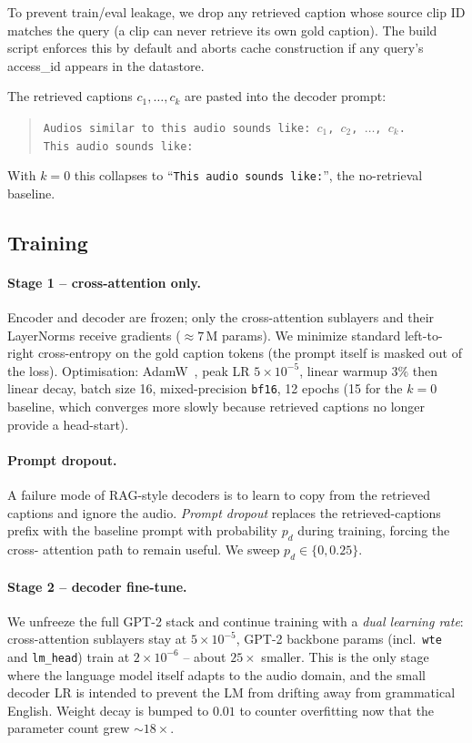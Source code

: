 \documentclass[10pt,twocolumn,letterpaper]{article}
\begin{document}
To prevent train/eval leakage, we drop any retrieved caption whose source clip
ID matches the query (a clip can never retrieve its own gold caption). The
build script enforces this by default and aborts cache construction if any
query's access\_id appears in the datastore.

The retrieved captions $c_1,\dots,c_k$ are pasted into the decoder prompt:
\begin{quote}\small
\texttt{Audios similar to this audio sounds like: $c_1$, $c_2$, $\dots$, $c_k$.}\\
\texttt{This audio sounds like:}
\end{quote}
With $k=0$ this collapses to ``\texttt{This audio sounds like:}'', the
no-retrieval baseline.

\subsection{Training}
\paragraph{Stage 1 -- cross-attention only.}
Encoder and decoder are frozen; only the cross-attention sublayers and their
LayerNorms receive gradients ($\approx 7$\,M params). We minimize standard
left-to-right cross-entropy on the gold caption tokens (the prompt itself is
masked out of the loss). Optimisation: AdamW~\cite{loshchilov2019adamw},
peak LR $5\!\times\!10^{-5}$, linear warmup $3\%$ then linear decay,
batch size 16, mixed-precision \texttt{bf16}, 12 epochs (15 for the $k{=}0$
baseline, which converges more slowly because retrieved captions no longer
provide a head-start).

\paragraph{Prompt dropout.} A failure mode of RAG-style decoders is to learn
to copy from the retrieved captions and ignore the audio.
\textit{Prompt dropout} replaces the retrieved-captions prefix with the
baseline prompt with probability $p_d$ during training, forcing the cross-
attention path to remain useful.
We sweep $p_d\in\{0, 0.25\}$.

\paragraph{Stage 2 -- decoder fine-tune.}
We unfreeze the full GPT-2 stack and continue training with a
\emph{dual learning rate}: cross-attention sublayers stay at
$5\!\times\!10^{-5}$, GPT-2 backbone params (incl.\ \texttt{wte} and
\texttt{lm\_head}) train at $2\!\times\!10^{-6}$ -- about $25\times$ smaller.
This is the only stage where the language model itself adapts to the
audio domain, and the small decoder LR is intended to prevent the LM from
drifting away from grammatical English. Weight decay is bumped to $0.01$ to
counter overfitting now that the parameter count grew $\sim 18\times$.
\end{document}
